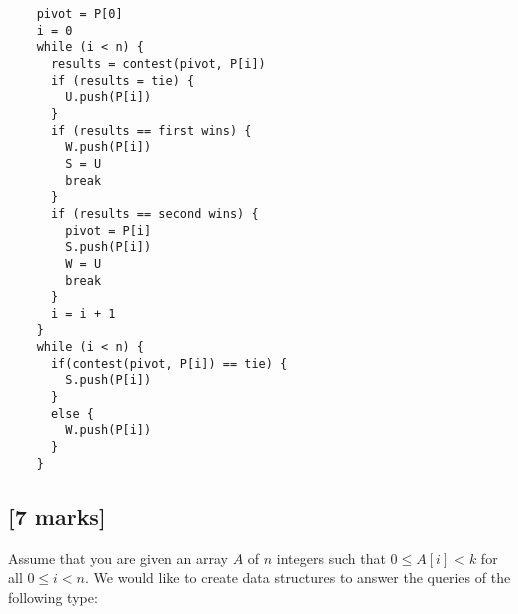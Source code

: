 \documentclass[12pt]{article}
\begin{document}
\begin{enumerate}
\begin{verbatim}
    pivot = P[0]
    i = 0
    while (i < n) {
      results = contest(pivot, P[i])
      if (results = tie) {
        U.push(P[i])
      }
      if (results == first wins) {
        W.push(P[i])
        S = U
        break
      }
      if (results == second wins) {
        pivot = P[i]
        S.push(P[i])
        W = U
        break
      }
      i = i + 1
    }
    while (i < n) {
      if(contest(pivot, P[i]) == tie) {
        S.push(P[i])
      }
      else {
        W.push(P[i])
      }
    }
\end{verbatim}







\end{enumerate}

\subsection{[7 marks]}

Assume that you are given an array $A$ of $n$ integers such that $0 \leq A [i]
< k$ for all $0 \leq i < n$. We would like to create data structures to answer
the queries of the following type:
\end{document}
